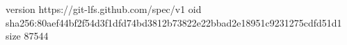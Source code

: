 version https://git-lfs.github.com/spec/v1
oid sha256:80aef44bf2f54d3f1dfd74bd3812b73822e22bbad2e18951c9231275cdfd51d1
size 87544
